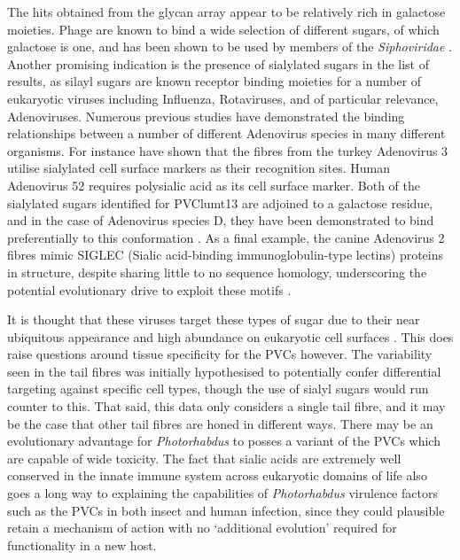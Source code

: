 The hits obtained from the glycan array appear to be relatively rich in galactose moieties. Phage are known to bind a wide selection of different sugars, of which galactose is one, and has been shown to be used by members of the \emph{Siphoviridae} \citep{BertozziSilva2016}. Another promising indication is the presence of sialylated sugars in the list of results, as silayl sugars are known receptor binding moieties for a number of eukaryotic viruses including Influenza, Rotaviruses, and of particular relevance, Adenoviruses. Numerous previous studies have demonstrated the binding relationships between a number of different Adenovirus species in many different organisms. For instance \cite{Singh2015} have shown that the fibres from the turkey Adenovirus 3 utilise sialylated cell surface markers as their recognition sites. Human Adenovirus 52 requires polysialic acid as its cell surface marker. Both of the sialylated sugars identified for PVClumt13 are adjoined to a galactose residue, and in the case of Adenovirus species D, they have been demonstrated to bind preferentially to this conformation \citep{Burmeister2004}. As a final example, the canine Adenovirus 2 fibres mimic SIGLEC  (Sialic acid-binding immunoglobulin-type lectins) proteins in structure, despite sharing little to no sequence homology, underscoring the potential evolutionary drive to exploit these motifs \citep{Rademacher2012}.

It is thought that these viruses target these types of sugar due to their near ubiquitous appearance and high abundance on eukaryotic cell surfaces \citep{Varki2012}. This does raise questions around tissue specificity for the PVCs however. The variability seen in the tail fibres was initially hypothesised to potentially confer differential targeting against specific cell types, though the use of sialyl sugars would run counter to this. That said, this data only considers a single tail fibre, and it may be the case that other tail fibres are honed in different ways. There may be an evolutionary advantage for \emph{Photorhabdus} to posses a variant of the PVCs which are capable of wide toxicity. The fact that sialic acids are extremely well conserved in the innate immune system across eukaryotic domains of life also goes a long way to explaining the capabilities of \emph{Photorhabdus} virulence factors such as the PVCs in both insect and human infection, since they could plausible retain a mechanism of action with no `additional evolution' required for functionality in a new host.

